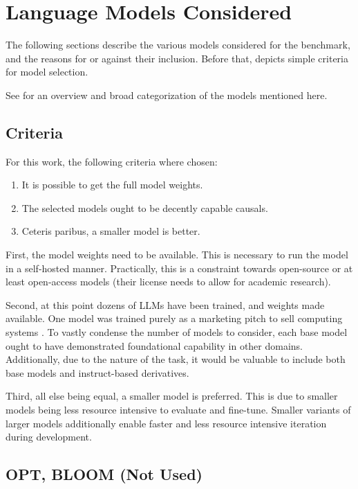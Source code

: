 \section{Language Models Considered}\label{sec:models}
The following sections describe the various models considered for the benchmark, and the reasons for or against their inclusion.
Before that,  depicts simple criteria for model selection.

See  for an overview and broad categorization of the models mentioned here.


\subsection{Criteria}\label{sub:criteria}
For this work, the following criteria where chosen:
\begin{enumerate}
    \item It is possible to get the full model weights.
    \item The selected models ought to be decently capable \glspl{causal}.
    \item Ceteris paribus, a smaller model is better.
\end{enumerate}

First, the model weights need to be available. This is necessary to run the model in a self-hosted manner.
Practically, this is a constraint towards open-source or at least open-access models (their license needs to allow for academic research).

Second, at this point dozens of \glspl{LLM} have been trained, and weights made available.
One model was trained purely as a marketing pitch to sell computing systems \cite{dey_cerebrasgpt_2023}.
To vastly condense the number of models to consider, each base model ought to have demonstrated foundational capability in other domains.
Additionally, due to the nature of the task, it would be valuable to include both base models and instruct-based derivatives.

Third, all else being equal, a smaller model is preferred.
This is due to smaller models being less resource intensive to evaluate and fine-tune.
Smaller variants of larger models additionally enable faster and less resource intensive iteration during development.


\subsection{OPT, BLOOM (Not Used)}
